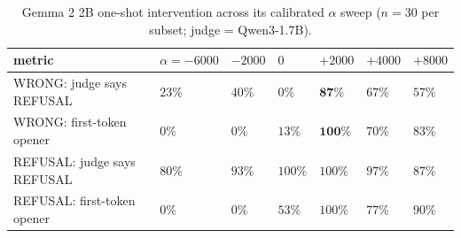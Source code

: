 \begin{table}[!htbp]
\small
\centering
\caption{Gemma 2 2B one-shot intervention across its calibrated
\(\alpha\) sweep (\(n = 30\) per subset; judge =
Qwen3-1.7B).\label{tbl:gemmasweep}}
\begin{tabular}{@{}
  >{\raggedright\arraybackslash}p{}
  >{\raggedleft\arraybackslash}p{}
  >{\raggedleft\arraybackslash}p{}
  >{\raggedleft\arraybackslash}p{}
  >{\raggedleft\arraybackslash}p{}
  >{\raggedleft\arraybackslash}p{}
  >{\raggedleft\arraybackslash}p{}@{}}
\toprule
\begin{minipage}[b]{\linewidth}\raggedright
metric
\end{minipage} & \begin{minipage}[b]{\linewidth}\raggedleft
\(\alpha = -6000\)
\end{minipage} & \begin{minipage}[b]{\linewidth}\raggedleft
\(-2000\)
\end{minipage} & \begin{minipage}[b]{\linewidth}\raggedleft
\(0\)
\end{minipage} & \begin{minipage}[b]{\linewidth}\raggedleft
\(+2000\)
\end{minipage} & \begin{minipage}[b]{\linewidth}\raggedleft
\(+4000\)
\end{minipage} & \begin{minipage}[b]{\linewidth}\raggedleft
\(+8000\)
\end{minipage} \\\midrule
WRONG: judge says REFUSAL & \(23\%\) & \(40\%\) & \(0\%\) &
\(\mathbf{87\%}\) & \(67\%\) & \(57\%\) \\
WRONG: first-token opener & \(0\%\) & \(0\%\) & \(13\%\) &
\(\mathbf{100\%}\) & \(70\%\) & \(83\%\) \\
REFUSAL: judge says REFUSAL & \(80\%\) & \(93\%\) & \(100\%\) &
\(100\%\) & \(97\%\) & \(87\%\) \\
REFUSAL: first-token opener & \(0\%\) & \(0\%\) & \(53\%\) & \(100\%\) &
\(77\%\) & \(90\%\) \\
\bottomrule
\end{tabular}
\end{table}

